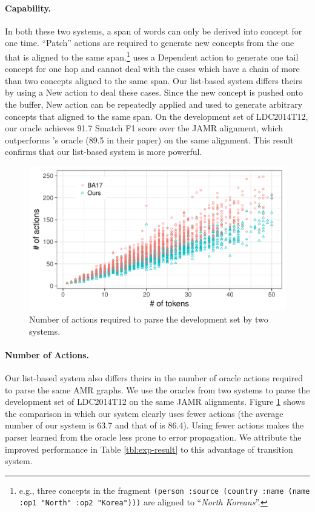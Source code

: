 \documentclass[11pt,a4paper]{article}
\begin{document}
\paragraph{Capability.} In both these two systems, a span of words can only be derived into concept for one time.
``Patch'' actions are required to generate new concepts from the one that 
is aligned to the same span.\footnote{
	e.g., three concepts in
	the fragment {\tt (person :source (country :name (name :op1 "North" :op2 "Korea")))}
	are aligned to ``{\it North Koreans}''.}
\citet{ballesteros-alonaizan:2017:EMNLP2017} uses a {\sc Dependent} action
to generate one tail concept for one hop and cannot deal with the cases
which have a chain of more than two concepts aligned to the same span.
Our list-based system differs theirs by using a {\sc New} action to deal these cases.
Since the new concept is pushed onto the buffer, {\sc New} action can be repeatedly
applied and used to generate arbitrary concepts that aligned to the same span. 
On the development set of LDC2014T12, our oracle achieves 91.7 Smatch F1 score
over the JAMR alignment, which outperforms \citet{ballesteros-alonaizan:2017:EMNLP2017}'s oracle 
(89.5 in their paper) on the same alignment.
This result confirms that our list-based system is more
powerful.

\begin{figure}
	\includegraphics[width=\columnwidth]{n_actions_embedded}
	\caption{Number of actions required to 
		parse the development set by two systems.}\label{fig:tok_act}
\end{figure}

\paragraph{Number of Actions.} Our list-based system also differs theirs in the number of
oracle actions required to parse the same AMR graphs.
We use the oracles from two systems to parse the development set of LDC2014T12
on the same JAMR alignments.
Figure \ref{fig:tok_act} shows the comparison in which our system
clearly uses fewer actions (the average number of our system is 63.7 and that of
\citet{ballesteros-alonaizan:2017:EMNLP2017} is 86.4).
Using fewer actions makes the parser learned from the oracle less
prone to error propagation. 
We attribute the improved performance in Table \ref{tbl:exp-result}
to this advantage of transition system.
\end{document}
